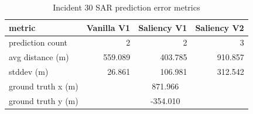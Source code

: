 \begin{table}[ht]
\centering
\caption{Incident 30 SAR prediction error metrics}
\label{tab:sar-incident-30}
\begin{tabular}{lrrr}
\hline
metric & Vanilla V1 & Saliency V1 & Saliency V2 \\
\hline
prediction count & 2 & 2 & 3 \\
avg distance (m) & 559.089 & 403.785 & 910.857 \\
stddev (m) & 26.861 & 106.981 & 312.542 \\
ground truth x (m) & \multicolumn{3}{c}{871.966} \\
ground truth y (m) & \multicolumn{3}{c}{-354.010} \\
\hline
\end{tabular}
\end{table}
